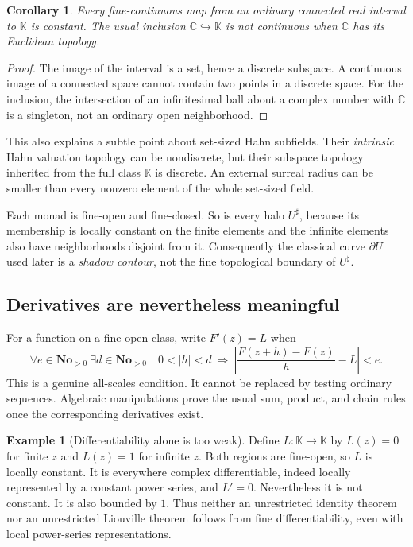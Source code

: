 \documentclass[11pt,letterpaper]{article}
\numberwithin{equation}{section}
\newtheorem{corollary}[theorem]{Corollary}
\theoremstyle{definition}
\newtheorem{example}[theorem]{Example}
\theoremstyle{remark}
\newcommand{\No}{\mathbf{No}}
\newcommand{\K}{\mathbb{K}}
\newcommand{\C}{\mathbb{C}}
\begin{document}
\begin{corollary}\label{cor:paths}
Every fine-continuous map from an ordinary connected real interval to $\K$
is constant. The usual inclusion $\C\hookrightarrow\K$ is not continuous
when $\C$ has its Euclidean topology.
\end{corollary}
\begin{proof}
The image of the interval is a set, hence a discrete subspace. A continuous
image of a connected space cannot contain two points in a discrete space.
For the inclusion, the intersection of an infinitesimal ball about a complex
number with $\C$ is a singleton, not an ordinary open neighborhood.
\end{proof}

This also explains a subtle point about set-sized Hahn subfields. Their
\emph{intrinsic} Hahn valuation topology can be nondiscrete, but their
subspace topology inherited from the full class $\K$ is discrete. An external
surreal radius can be smaller than every nonzero element of the whole
set-sized field.

Each monad is fine-open and fine-closed. So is every halo $U^\sharp$, because
its membership is locally constant on the finite elements and the infinite
elements also have neighborhoods disjoint from it. Consequently the classical
curve $\partial U$ used later is a \emph{shadow contour}, not the fine
topological boundary of $U^\sharp$.

\subsection{Derivatives are nevertheless meaningful}

For a function on a fine-open class, write $F'(z)=L$ when
\begin{equation}\label{eq:derivative}
 \forall e\in\No_{>0}\ \exists d\in\No_{>0}\quad
 0<|h|<d\ \Longrightarrow\
 \left|\frac{F(z+h)-F(z)}h-L\right|<e.
\end{equation}
This is a genuine all-scales condition. It cannot be replaced by testing
ordinary sequences. Algebraic manipulations prove the usual sum, product,
and chain rules once the corresponding derivatives exist.

\begin{example}[Differentiability alone is too weak]\label{ex:locallyconstant}
Define $L:\K\to\K$ by $L(z)=0$ for finite $z$ and $L(z)=1$ for infinite $z$.
Both regions are fine-open, so $L$ is locally constant. It is everywhere
complex differentiable, indeed locally represented by a constant power series,
and $L'=0$. Nevertheless it is not constant. It is also bounded by $1$.
Thus neither an unrestricted identity theorem nor an unrestricted Liouville
theorem follows from fine differentiability, even with local power-series
representations.
\end{example}
\end{document}
